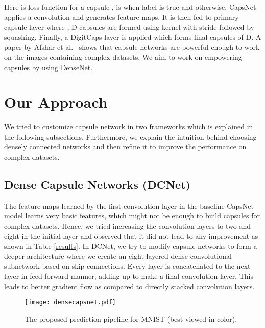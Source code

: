 \documentclass{bmvc2k}
\begin{document}
Here  is loss function for a capsule ,  is  when label is true and  otherwise. 
CapsNet applies a convolution and generates  feature maps. It is then fed to primary capsule layer where , D capsules are formed  using  kernel with stride  followed by squashing. Finally, a DigitCaps layer is applied which forms final capsules of D. A paper by Afshar et al.\ \cite{capsulepapertumor} shows that capsule networks are powerful enough to work on the images containing complex datasets. We aim to work on empowering capsules by using DenseNet.

\section{Our Approach}
\label{sec:approach}
We tried to customize capsule network in two frameworks which is explained in the following subsections. Furthermore, we explain the intuition behind choosing densely connected networks and then refine it to improve the performance on complex datasets.
\subsection{Dense Capsule Networks (DCNet)}
\label{sec:densecapsnet}
The feature maps learned by the first convolution layer in the baseline CapsNet model learns very basic features, which might not be enough to build capsules for complex datasets. Hence, we tried increasing the convolution layers to two and eight in the initial layer and observed that it did not lead to any improvement as shown in Table \ref{results}.  
In DCNet, we try to modify capsule networks to form a deeper architecture where we create an eight-layered dense convolutional subnetwork based on skip connections. Every layer is concatenated to the next layer in feed-forward manner, adding up to make a final convolution layer. This leads to better gradient flow as compared to directly stacked convolution layers.  

\begin{figure*}[!htbp]
\begin{center}
\texttt{[image: densecapsnet.pdf]}
\end{center}
   \vspace*{-4mm}
   \caption{The proposed prediction pipeline for MNIST (best viewed in color).}
\label{fig:architecture}
\end{figure*}
\end{document}

